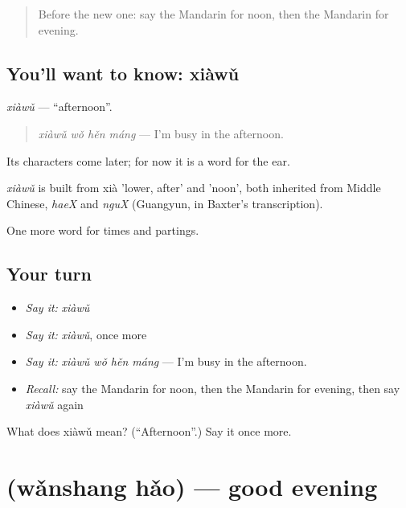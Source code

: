 \begin{quote}
Before the new one: say the Mandarin for noon, then the Mandarin for evening.
\end{quote}

\subsection*{You'll want to know: xiàwǔ}
\emph{xiàwǔ} — \textquotedblleft{}afternoon\textquotedblright{}.

\begin{quote}
\emph{xiàwǔ wǒ hěn máng} — I'm busy in the afternoon.
\end{quote}

Its characters come later; for now it is a word for the ear.

\begin{cousinweb}
\emph{xiàwǔ} is built from xià 'lower, after' and  'noon', both inherited from Middle Chinese, \emph{haeX} and \emph{nguX} (Guangyun, in Baxter's transcription).
\end{cousinweb}

\begin{grammarlens}[title={What you've built}]
One more word for times and partings.
\end{grammarlens}

\subsection*{Your turn}
\begin{itemize}
\raggedright
  \item \emph{Say it:} \emph{xiàwǔ}
  \item \emph{Say it:} \emph{xiàwǔ}, once more
  \item \emph{Say it:} \emph{xiàwǔ wǒ hěn máng} — I'm busy in the afternoon.
  \item \emph{Recall:} say the Mandarin for noon, then the Mandarin for evening, then say \emph{xiàwǔ} again
\end{itemize}

\begin{tcolorbox}[breakable,colback=teal!4,colframe=teal!35!black,title={Before you move on}]
What does xiàwǔ mean? (\textquotedblleft{}Afternoon\textquotedblright{}.) Say it once more.
\end{tcolorbox}
\section[\texorpdfstring{\zh{晚上好} (wǎnshang hǎo)}{晚上好 (wǎnshang hǎo)}]{ (wǎnshang hǎo) — good evening}

